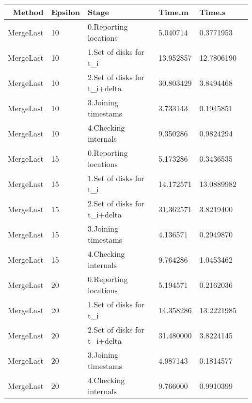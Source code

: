 \documentclass[11pt]{article}
\begin{document}
    \begin{tabular}{r|lllll}
 Method & Epsilon & Stage & Time.m & Time.s\\
\hline
	 MergeLast                    & 10                           & 0.Reporting locations        &  5.040714                    &  0.3771953                  \\
	 MergeLast                      & 10                             & 1.Set of disks for t\_i       & 13.952857                      & 12.7806190                    \\
	 MergeLast                      & 10                             & 2.Set of disks for t\_i+delta & 30.803429                      &  3.8494468                    \\
	 MergeLast                    & 10                           & 3.Joining timestams          &  3.733143                    &  0.1945851                  \\
	 MergeLast                    & 10                           & 4.Checking internals         &  9.350286                    &  0.9824294                  \\
	 MergeLast                    & 15                           & 0.Reporting locations        &  5.173286                    &  0.3436535                  \\
	 MergeLast                      & 15                             & 1.Set of disks for t\_i       & 14.172571                      & 13.0889982                    \\
	 MergeLast                      & 15                             & 2.Set of disks for t\_i+delta & 31.362571                      &  3.8219400                    \\
	 MergeLast                    & 15                           & 3.Joining timestams          &  4.136571                    &  0.2949870                  \\
	 MergeLast                    & 15                           & 4.Checking internals         &  9.764286                    &  1.0453462                  \\
	 MergeLast                    & 20                           & 0.Reporting locations        &  5.194571                    &  0.2162036                  \\
	 MergeLast                      & 20                             & 1.Set of disks for t\_i       & 14.358286                      & 13.2221985                    \\
	 MergeLast                      & 20                             & 2.Set of disks for t\_i+delta & 31.480000                      &  3.8224145                    \\
	 MergeLast                    & 20                           & 3.Joining timestams          &  4.987143                    &  0.1814577                  \\
	 MergeLast                    & 20                           & 4.Checking internals         &  9.766000                    &  0.9910399                  \\
\end{tabular}
\end{document}
